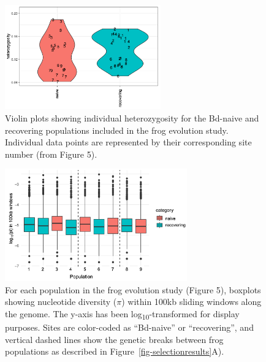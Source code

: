 \documentclass[9pt,twoside,lineno]{pnas-new-SI}
\begin{document}
\begin{figure}

{\centering \includegraphics[width=0.60\textwidth]{figures/violin_plot_heterozy_by_group.png}

}

\caption{\label{fig-violinplot-heterozy}Violin plots showing individual
heterozygosity for the Bd-naive and recovering populations included in
the frog evolution study. Individual data points are represented by
their corresponding site number (from
Figure 5).}

\end{figure}\clearpage

\newpage

\begin{figure}

{\centering \includegraphics[width=0.70\textwidth]{figures/boxplot_genomewide_pi_by_pop.png}

}

\caption{\label{fig-boxplot-genomewide-pi-by-pop}For each population in
the frog evolution study (Figure 5), boxplots
showing nucleotide diversity (\(\pi\)) within 100kb sliding windows
along the genome. The y-axis has been log\textsubscript{10}-transformed
for display purposes. Sites are color-coded as ``Bd-naive'' or
``recovering'', and vertical dashed lines show the genetic breaks
between frog populations as described in
Figure~\ref{fig-selectionresults}A).}

\end{figure}\clearpage
\end{document}
